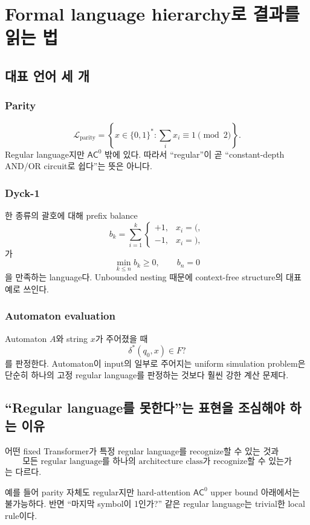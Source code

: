 \documentclass[11pt,a4paper,oneside,openany]{memoir}
\theoremstyle{definition}
\newcommand{\bits}{\{0,1\}}
\newcommand{\AC}{\mathsf{AC}}
\begin{document}
\chapter{Formal language hierarchy로 결과를 읽는 법}

\section{대표 언어 세 개}

\subsection{Parity}
\[
\mathcal L_{\mathrm{parity}}
=
\left\{x\in\bits^*: \sum_i x_i\equiv 1\pmod 2\right\}.
\]
Regular language지만 $\AC^0$ 밖에 있다. 따라서 ``regular''이 곧 ``constant-depth AND/OR circuit로 쉽다''는 뜻은 아니다.

\subsection{Dyck-1}
한 종류의 괄호에 대해 prefix balance
\[
b_k=\sum_{i=1}^{k}
\begin{cases}
+1,&x_i=(,\\
-1,&x_i=),
\end{cases}
\]
가
\[
\min_{k\le n} b_k\ge 0,
\qquad
b_n=0
\]
을 만족하는 language다.
Unbounded nesting 때문에 context-free structure의 대표 예로 쓰인다.

\subsection{Automaton evaluation}
Automaton $A$와 string $x$가 주어졌을 때
\[
\delta^*(q_0,x)\in F?
\]
를 판정한다.
Automaton이 input의 일부로 주어지는 uniform simulation problem은 단순히 하나의 고정 regular language를 판정하는 것보다 훨씬 강한 계산 문제다.

\section{``Regular language를 못한다''는 표현을 조심해야 하는 이유}

어떤 fixed Transformer가 특정 regular language를 recognize할 수 있는 것과
\[
\text{모든 regular language를 하나의 architecture class가 recognize할 수 있는가}
\]
는 다르다.

예를 들어 parity 자체도 regular지만 hard-attention $\AC^0$ upper bound 아래에서는 불가능하다.
반면 ``마지막 symbol이 1인가?'' 같은 regular language는 trivial한 local rule이다.
\end{document}
